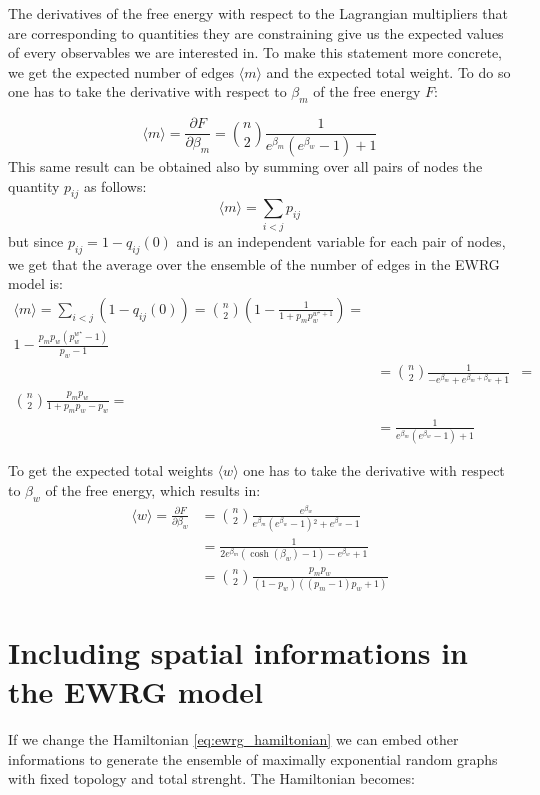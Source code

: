 \documentclass[a4paper]{article}
\begin{document}
The derivatives of the free energy with respect to the Lagrangian multipliers that are corresponding to quantities they are  constraining give us the expected values of every observables we are interested in.
To make this statement more concrete, we get the expected number of edges $\langle m \rangle$ and the expected total weight.
To do so one has to take the derivative with respect to $\beta_m$ of the free energy $F$:

\begin{equation}
\langle m \rangle = \frac{\partial F}{\partial \beta_m} = \binom{n}{2} \frac{1}{e^{\beta _m} \left(e^{\beta _w}-1\right)+1}
\end{equation}
 This same result can be obtained also by summing over all pairs of
nodes the quantity $p_{ij}$ as follows:
\begin{equation}
\langle m \rangle = \sum_{i < j} p_{ij}
\end{equation}
but since $p_{ij} = 1-q_{ij}(0)$ and is an independent variable for each pair of nodes, we get that the average over the ensemble of the number of edges in the EWRG model is:
\begin{align}
\langle m \rangle = \sum_{i < j} (1-q_{ij}(0)) = \binom{n}{2}\left(1-\frac{1}{1+p_m p_w^{w^\star+1}} \right ) = \\ 1-\frac{ p_m p_w \left(p_w^{w^\star}-1\right)}{p_w-1} \\
&= \binom{n}{2} \frac{1}{-e^{\beta _m}+e^{\beta _m+\beta _w}+1} &=\\ \binom{n}{2} \frac{p_m p_w}{1+p_m p_w - p_w} = \\ &=
\frac{1}{e^{\beta _m} \left(e^{\beta _w}-1\right)+1}
\end{align}

To get the expected total weights $\langle w \rangle $ one has to take the derivative with respect to $\beta_w$ of the free energy, which results in: 
\begin{align}
\langle w \rangle = \frac{\partial F}{\partial \beta_w} &=  \binom{n}{2} \frac{e^{\beta _w}}{e^{\beta _m} \left(e^{\beta _w}-1\right){}^2+e^{\beta_w}-1} \\ &= 
\frac{1}{2 e^{\beta _m} \left(\cosh \left(\beta _w\right)-1\right)-e^{\beta
   _w}+1} \\ & = 
\binom{n}{2} \frac{p_m p_w}{(1-p_w)\left((p_m-1)p_w +1\right)}
\end{align}


\section{Including spatial informations in the EWRG model}
If we change the Hamiltonian \ref{eq:ewrg_hamiltonian} we can embed other informations to generate the ensemble of maximally exponential random graphs with fixed topology and total strenght. The Hamiltonian becomes:
\end{document}
